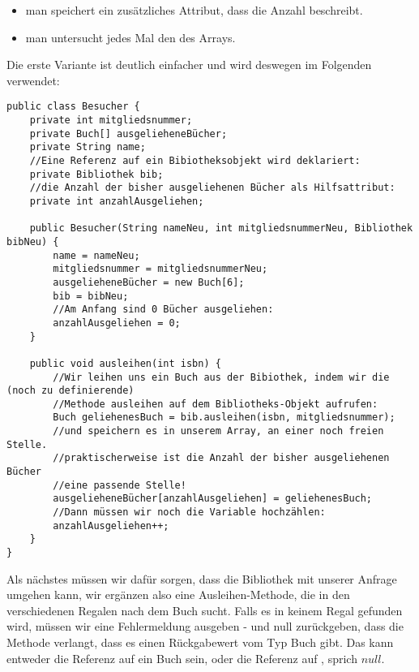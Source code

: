 \documentclass{article}
\begin{document}
\begin{itemize}
    \item man speichert ein zusätzliches Attribut, dass die Anzahl beschreibt.
    \item man untersucht jedes Mal den  des Arrays.
\end{itemize}

Die erste Variante ist deutlich einfacher und wird deswegen im Folgenden verwendet:

\begin{verbatim}
public class Besucher {
    private int mitgliedsnummer; 
    private Buch[] ausgelieheneBücher;
    private String name;
    //Eine Referenz auf ein Bibiotheksobjekt wird deklariert:
    private Bibliothek bib;
    //die Anzahl der bisher ausgeliehenen Bücher als Hilfsattribut:
    private int anzahlAusgeliehen;

    public Besucher(String nameNeu, int mitgliedsnummerNeu, Bibliothek bibNeu) {
        name = nameNeu;
        mitgliedsnummer = mitgliedsnummerNeu;
        ausgelieheneBücher = new Buch[6];
        bib = bibNeu;
        //Am Anfang sind 0 Bücher ausgeliehen:
        anzahlAusgeliehen = 0;
    }

    public void ausleihen(int isbn) {
        //Wir leihen uns ein Buch aus der Bibiothek, indem wir die (noch zu definierende)
        //Methode ausleihen auf dem Bibliotheks-Objekt aufrufen: 
        Buch geliehenesBuch = bib.ausleihen(isbn, mitgliedsnummer);
        //und speichern es in unserem Array, an einer noch freien Stelle.
        //praktischerweise ist die Anzahl der bisher ausgeliehenen Bücher
        //eine passende Stelle!
        ausgelieheneBücher[anzahlAusgeliehen] = geliehenesBuch;
        //Dann müssen wir noch die Variable hochzählen:
        anzahlAusgeliehen++;
    }
}
\end{verbatim}

Als nächstes müssen wir dafür sorgen, dass die Bibliothek mit unserer Anfrage umgehen kann, wir ergänzen also eine Ausleihen-Methode, die in den verschiedenen Regalen nach dem Buch sucht. Falls es in keinem Regal gefunden wird, müssen wir eine Fehlermeldung ausgeben - und null zurückgeben, dass die Methode verlangt, dass es einen Rückgabewert vom Typ Buch gibt. Das kann entweder die Referenz auf ein  Buch sein, oder die Referenz auf , sprich $null$.
\end{document}
